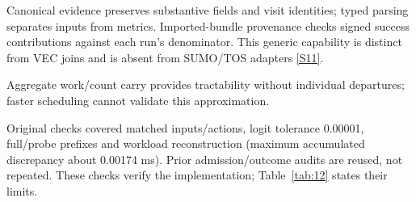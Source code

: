 \documentclass[11pt,a4paper]{article}
\begin{document}
Canonical evidence preserves substantive fields and visit identities; typed parsing separates inputs from metrics. Imported-bundle provenance checks signed success contributions against each run's denominator. This generic capability is distinct from VEC joins and is absent from SUMO/TOS adapters \hyperref[source-s11]{[S11]}.

Aggregate work/count carry provides tractability without individual departures; faster scheduling cannot validate this approximation.

Original checks covered matched inputs/actions, logit tolerance 0.00001, full/probe prefixes and workload reconstruction (maximum accumulated discrepancy about 0.00174 ms). Prior admission/outcome audits are reused, not repeated. These checks verify the implementation; Table~\ref{tab:12} states their limits.
\end{document}
